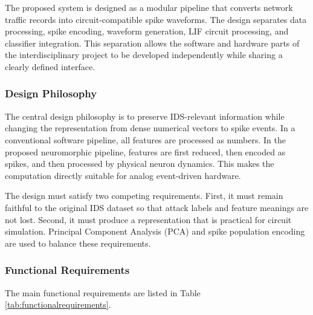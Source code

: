 \documentclass{ieeeaccess}
\begin{document}
The proposed system is designed as a modular pipeline that converts network traffic records into circuit-compatible spike waveforms. The design separates data processing, spike encoding, waveform generation, LIF circuit processing, and classifier integration. This separation allows the software and hardware parts of the interdisciplinary project to be developed independently while sharing a clearly defined interface.

\subsubsection{Design Philosophy}

The central design philosophy is to preserve IDS-relevant information while changing the representation from dense numerical vectors to spike events. In a conventional software pipeline, all features are processed as numbers. In the proposed neuromorphic pipeline, features are first reduced, then encoded as spikes, and then processed by physical neuron dynamics. This makes the computation directly suitable for analog event-driven hardware.

The design must satisfy two competing requirements. First, it must remain faithful to the original IDS dataset so that attack labels and feature meanings are not lost. Second, it must produce a representation that is practical for circuit simulation. Principal Component Analysis (PCA) and spike population encoding are used to balance these requirements.

\subsubsection{Functional Requirements}

The main functional requirements are listed in Table \ref{tab:functionalrequirements}.
\end{document}
